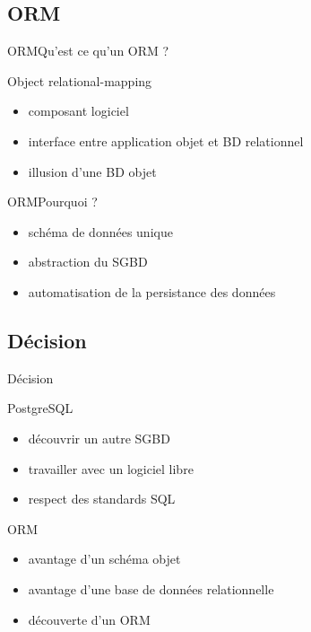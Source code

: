\subsection{ORM}
\begin{frame}{ORM}{Qu'est ce qu'un ORM ?}
  \begin{block}{Object relational-mapping}
    \begin{itemize}
      \item composant logiciel
      \item interface entre application objet et BD relationnel
      \item illusion d'une BD objet
    \end{itemize}
  \end{block}
\end{frame}

\begin{frame}{ORM}{Pourquoi ?}
  \begin{itemize}
    \item schéma de données unique
    \item abstraction du SGBD
    \item automatisation de la persistance des données
  \end{itemize}
\end{frame}

\subsection{Décision}
\begin{frame}{Décision}
  \begin{block}{PostgreSQL}
    \begin{itemize}
      \item découvrir un autre SGBD
      \item travailler avec un logiciel libre
      \item respect des standards SQL
    \end{itemize}
  \end{block}
  \begin{block}{ORM}
    \begin{itemize}
      \item avantage d'un schéma objet
      \item avantage d'une base de données relationnelle
      \item découverte d'un ORM
    \end{itemize}
  \end{block}
\end{frame}

